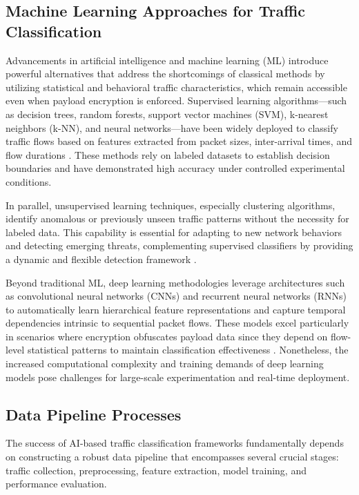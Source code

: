 \documentclass[sigconf]{acmart}
\begin{document}
\subsection{Machine Learning Approaches for Traffic Classification}

Advancements in artificial intelligence and machine learning (ML) introduce powerful alternatives that address the shortcomings of classical methods by utilizing statistical and behavioral traffic characteristics, which remain accessible even when payload encryption is enforced. Supervised learning algorithms—such as decision trees, random forests, support vector machines (SVM), k-nearest neighbors (k-NN), and neural networks—have been widely deployed to classify traffic flows based on features extracted from packet sizes, inter-arrival times, and flow durations \cite{ref51}. These methods rely on labeled datasets to establish decision boundaries and have demonstrated high accuracy under controlled experimental conditions.

In parallel, unsupervised learning techniques, especially clustering algorithms, identify anomalous or previously unseen traffic patterns without the necessity for labeled data. This capability is essential for adapting to new network behaviors and detecting emerging threats, complementing supervised classifiers by providing a dynamic and flexible detection framework \cite{ref51}.

Beyond traditional ML, deep learning methodologies leverage architectures such as convolutional neural networks (CNNs) and recurrent neural networks (RNNs) to automatically learn hierarchical feature representations and capture temporal dependencies intrinsic to sequential packet flows. These models excel particularly in scenarios where encryption obfuscates payload data since they depend on flow-level statistical patterns to maintain classification effectiveness \cite{ref1,ref6,ref51}. Nonetheless, the increased computational complexity and training demands of deep learning models pose challenges for large-scale experimentation and real-time deployment.

\subsection{Data Pipeline Processes}

The success of AI-based traffic classification frameworks fundamentally depends on constructing a robust data pipeline that encompasses several crucial stages: traffic collection, preprocessing, feature extraction, model training, and performance evaluation.
\end{document}
